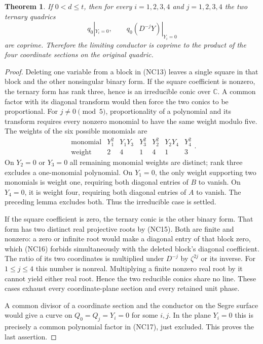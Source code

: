 \documentclass[11pt]{article}
\newtheorem{theorem}{Theorem}
\newcommand{\C}{\mathbb C}
\begin{document}
\begin{theorem}
If $0<d\le t$, then for every $i=1,2,3,4$ and $j=1,2,3,4$ the
two ternary quadrics
\[
 q_0|_{Y_i=0},\qquad q_0(D^{-j}Y)|_{Y_i=0}
 \tag{NC17}
\]
are coprime. Therefore the limiting conductor is coprime to the
product of the four coordinate sections on the original quadric.
\end{theorem}
\begin{proof}
Deleting one variable from a block in (NC13) leaves a single square
in that block and the other nonsingular binary form. If the square
coefficient is nonzero, the ternary form has rank three, hence is an
irreducible conic over $\C$. A common factor with its diagonal
transform would then force the two conics to be proportional.
For $j\ne0\pmod5$, proportionality of a polynomial and its transform
requires every nonzero monomial to have the same weight modulo five.
The weights of the six possible monomials are
\[
\begin{array}{c|rrrrrr}
 \text{monomial}&Y_1^2&Y_1Y_3&Y_3^2&Y_2^2&Y_2Y_4&Y_4^2\\
 \text{weight}&2&4&1&4&1&3
\end{array}. \tag{NC18}
\]
On $Y_2=0$ or $Y_3=0$ all remaining monomial weights are distinct;
rank three excludes a one-monomial polynomial. On $Y_1=0$, the only
weight supporting two monomials is weight one, requiring both diagonal
entries of $B$ to vanish. On $Y_4=0$, it is weight four, requiring both
diagonal entries of $A$ to vanish. The preceding lemma excludes both.
Thus the irreducible case is settled.

If the square coefficient is zero, the ternary conic is the other
binary form. That form has two distinct real projective roots by
(NC15). Both are finite and nonzero: a zero or infinite root would
make a diagonal entry of that block zero, which (NC16) forbids
simultaneously with the deleted block's diagonal coefficient.
The ratio of its two coordinates is multiplied under $D^{-j}$ by
$\zeta^{2j}$ or its inverse. For $1\le j\le4$ this number is
nonreal. Multiplying a finite nonzero real root by it cannot yield
either real root. Hence the two reducible conics share no line.
These cases exhaust every coordinate-plane section and every retained
unit phase.

A common divisor of a coordinate section and the conductor on the
Segre surface would give a curve on $Q_0=Q_j=Y_i=0$ for some $i,j$.
In the plane $Y_i=0$ this is precisely a common polynomial factor in
(NC17), just excluded. This proves the last assertion.
\end{proof}
\end{document}
